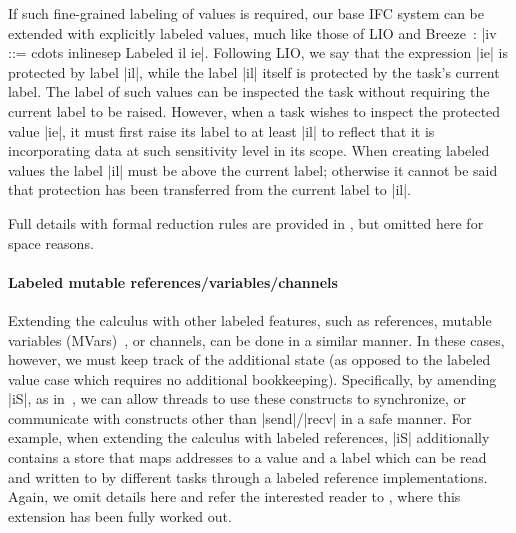 If such fine-grained labeling of values is required, our base IFC
system can be extended with explicitly labeled
values, much like those of LIO and
Breeze~\cite{lio, Hritcu:2013:YIB:2497621.2498098}: |iv ::= cdots
inlinesep Labeled il ie|.
%
Following LIO, we say that the expression |ie| is protected by label |il|,
while the label |il| itself is protected by the task's current label.
%
%
The label of such values can be inspected the task without
requiring the current label to be raised.
%
However, when a task wishes to inspect the protected value |ie|, it
must first raise its label to at least |il| to reflect that it is
incorporating data at such sensitivity level in its scope.
%
When creating labeled values the label |il| must be above
the current label; otherwise it cannot be said that protection has
been transferred from the current label to |il|.
%


Full details with formal reduction rules are provided
in \appendixext{}, but omitted here for space reasons.

\paragraph{Labeled mutable references/variables/channels}
%
Extending the calculus with other labeled features, such as
references, mutable variables (MVars)~\cite{CH96}, or channels,
can be done in a similar manner.
%
In these cases, however, we must keep track of the additional state
(as opposed to the labeled value case which requires no additional
bookkeeping).
%
%
Specifically, by amending |iS|, as in~\cite{lio,
stefan:addressing-covert}, we can allow threads to use these
constructs to synchronize, or communicate with constructs other than
|send|/|recv| in a safe manner.
%
For example, when extending the calculus with labeled references, |iS|
additionally contains a store that maps addresses to a value
and a label
which can be read and written to by different tasks through a labeled
reference implementations.
Again, we omit details here and refer the interested reader
to \appendixext{}, where this extension has been fully worked out.

